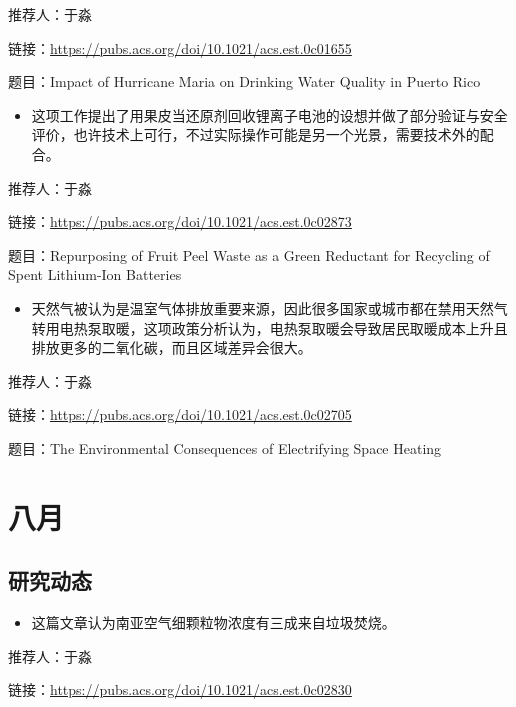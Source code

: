 \documentclass[]{book}
\providecommand{\tightlist}{%
  \setlength{\itemsep}{0pt}\setlength{\parskip}{0pt}}
\begin{document}
推荐人：于淼

链接：\url{https://pubs.acs.org/doi/10.1021/acs.est.0c01655}

题目：Impact of Hurricane Maria on Drinking Water Quality in Puerto Rico

\begin{itemize}
\tightlist
\item
  这项工作提出了用果皮当还原剂回收锂离子电池的设想并做了部分验证与安全评价，也许技术上可行，不过实际操作可能是另一个光景，需要技术外的配合。
\end{itemize}

推荐人：于淼

链接：\url{https://pubs.acs.org/doi/10.1021/acs.est.0c02873}

题目：Repurposing of Fruit Peel Waste as a Green Reductant for Recycling of Spent Lithium-Ion Batteries

\begin{itemize}
\tightlist
\item
  天然气被认为是温室气体排放重要来源，因此很多国家或城市都在禁用天然气转用电热泵取暖，这项政策分析认为，电热泵取暖会导致居民取暖成本上升且排放更多的二氧化碳，而且区域差异会很大。
\end{itemize}

推荐人：于淼

链接：\url{https://pubs.acs.org/doi/10.1021/acs.est.0c02705}

题目：The Environmental Consequences of Electrifying Space Heating

\hypertarget{ux516bux6708-2}{%
\section*{八月}\label{ux516bux6708-2}}

\hypertarget{ux7814ux7a76ux52a8ux6001-33}{%
\subsection*{研究动态}\label{ux7814ux7a76ux52a8ux6001-33}}

\begin{itemize}
\tightlist
\item
  这篇文章认为南亚空气细颗粒物浓度有三成来自垃圾焚烧。
\end{itemize}

推荐人：于淼

链接：\url{https://pubs.acs.org/doi/10.1021/acs.est.0c02830}
\end{document}
